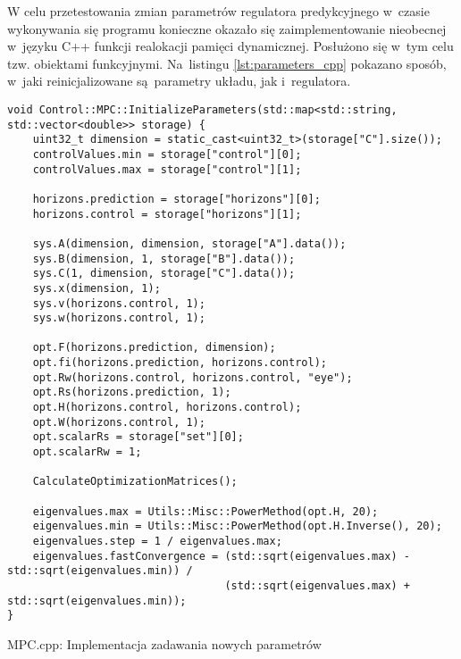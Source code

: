 W celu przetestowania zmian parametrów regulatora predykcyjnego w~czasie wykonywania się programu
konieczne okazało się zaimplementowanie nieobecnej w~języku C++ funkcji realokacji pamięci
dynamicznej. Posłużono się w~tym celu tzw. obiektami funkcyjnymi. Na~listingu
\ref{lst:parameters_cpp} pokazano sposób, w~jaki reinicjalizowane są~parametry układu, jak i~regulatora. 
\begin{listing}[htb]
\begin{verbatim}
void Control::MPC::InitializeParameters(std::map<std::string, std::vector<double>> storage) {
    uint32_t dimension = static_cast<uint32_t>(storage["C"].size());
    controlValues.min = storage["control"][0];
    controlValues.max = storage["control"][1];

    horizons.prediction = storage["horizons"][0];
    horizons.control = storage["horizons"][1];

    sys.A(dimension, dimension, storage["A"].data());
    sys.B(dimension, 1, storage["B"].data());
    sys.C(1, dimension, storage["C"].data());
    sys.x(dimension, 1);
    sys.v(horizons.control, 1);
    sys.w(horizons.control, 1);

    opt.F(horizons.prediction, dimension);
    opt.fi(horizons.prediction, horizons.control);
    opt.Rw(horizons.control, horizons.control, "eye");
    opt.Rs(horizons.prediction, 1);
    opt.H(horizons.control, horizons.control);
    opt.W(horizons.control, 1);
    opt.scalarRs = storage["set"][0];
    opt.scalarRw = 1;

    CalculateOptimizationMatrices();

    eigenvalues.max = Utils::Misc::PowerMethod(opt.H, 20);
    eigenvalues.min = Utils::Misc::PowerMethod(opt.H.Inverse(), 20);
    eigenvalues.step = 1 / eigenvalues.max;
    eigenvalues.fastConvergence = (std::sqrt(eigenvalues.max) - std::sqrt(eigenvalues.min)) /
                                  (std::sqrt(eigenvalues.max) + std::sqrt(eigenvalues.min));
}
\end{verbatim}
\caption{MPC.cpp: Implementacja zadawania nowych parametrów}
\label{lst:parameters_cpp}
\end{listing}

